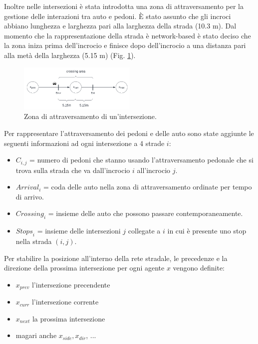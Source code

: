 Inoltre nelle intersezioni è stata introdotta una zona di attraversamento per la gestione delle interazioni tra auto e pedoni.
È stato assunto che gli incroci abbiano lunghezza e larghezza pari alla larghezza della strada (10.3 m).
Dal momento che la rappresentazione della strada è network-based è stato deciso che 
la zona iniza prima dell'incrocio e finisce dopo dell'incrocio a una distanza pari alla metà della larghezza (5.15 m) (Fig. \ref{fig:crossing-area}).

\begin{figure}[ht]
    \centering
    \includegraphics[width=0.5\textwidth]{images/crossing_area}
    \caption{Zona di attraversamento di un'intersezione.}    
    \label{fig:crossing-area}
\end{figure}

\newpage
Per rappresentare l'attraversamento dei pedoni e delle auto sono state aggiunte le seguenti informazioni ad ogni intersezione a 4 strade $i$:
\begin{itemize}
    \item $C_{i, j}$ = numero di pedoni che stanno usando l'attraversamento pedonale che si trova sulla strada che va dall'incrocio $i$ all'incrocio $j$.
    \item $\textit{Arrival}_i$ = coda delle auto nella zona di attraversamento ordinate per tempo di arrivo.
    \item $\textit{Crossing}_i$ = insieme delle auto che possono passare contemporaneamente.
    \item $\textit{Stops}_i$ = insieme delle intersezioni $j$ collegate a $i$ in cui è presente uno stop nella strada $(i, j)$.
\end{itemize}


Per stabilire la posizione all'interno della rete stradale, le precedenze e la direzione della prossima intersezione per ogni agente $x$ 
vengono definite:
\begin{itemize}
    \item $x_{prev}$ l'intersezione precendente
    \item $x_{curr}$ l'intersezione corrente
    \item $x_{next}$ la prossima intersezione
    \item magari anche $x_{side}, x_{dir}$, ...
\end{itemize}

